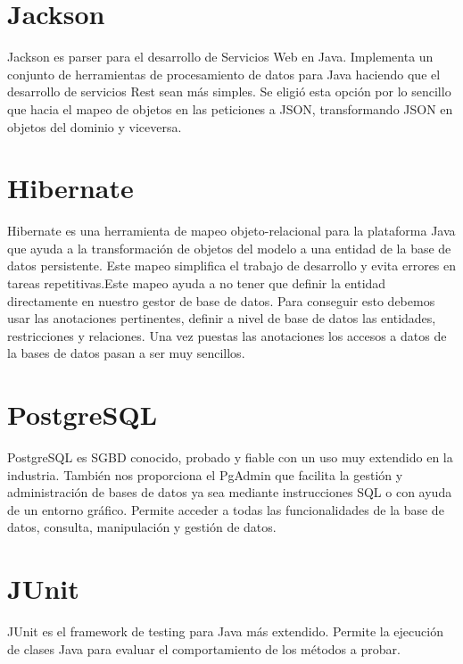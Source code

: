 \section{Jackson}

Jackson es parser para el desarrollo de Servicios Web en Java. Implementa un conjunto de   herramientas de procesamiento de datos para Java haciendo que el desarrollo de servicios Rest sean más simples. Se eligió esta opción por lo sencillo que hacia el mapeo de objetos en las peticiones a JSON, transformando  JSON en objetos del dominio y viceversa.








\section{Hibernate}
Hibernate es una herramienta de mapeo objeto-relacional para la plataforma Java que ayuda a la transformación de objetos del modelo a una entidad de la base de datos persistente. Este mapeo simplifica el trabajo de desarrollo y evita errores en tareas repetitivas.Este mapeo ayuda a  no tener que definir la entidad directamente en nuestro gestor de base de datos. Para conseguir esto debemos usar las anotaciones pertinentes, definir a nivel de base de datos las entidades, restricciones y relaciones. Una vez puestas las anotaciones los accesos a datos de la  bases de datos pasan a ser muy sencillos.





\section{PostgreSQL}
PostgreSQL es SGBD conocido, probado y fiable con un uso muy extendido en la industria. También nos proporciona  el PgAdmin que facilita la gestión y administración de bases de datos ya sea mediante instrucciones SQL o con ayuda de un entorno gráfico. Permite acceder a todas las funcionalidades de la base de datos, consulta, manipulación y gestión de datos.
\section{JUnit}
JUnit es el framework de testing para Java más extendido.
Permite la ejecución de clases Java para evaluar el comportamiento de los métodos a probar.


\vspace{1cm}


